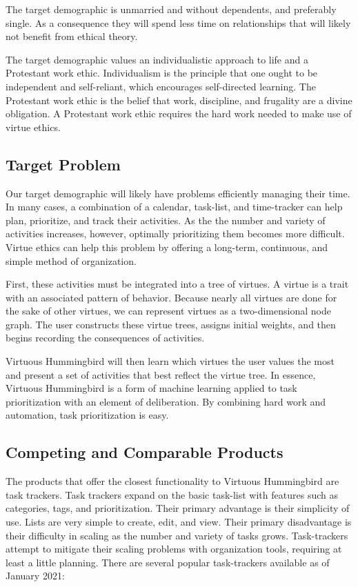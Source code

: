 \documentclass{article}
\begin{document}
The target demographic is unmarried and without dependents, and preferably single.
As a consequence they will spend less time on relationships that will likely not benefit from ethical theory.

The target demographic values an individualistic approach to life and a Protestant work ethic.
Individualism is the principle that one ought to be independent and self-reliant, which encourages self-directed learning.
The Protestant work ethic is the belief that work, discipline, and frugality are a divine obligation.
A Protestant work ethic requires the hard work needed to make use of virtue ethics.

\subsection{Target Problem}

Our target demographic will likely have problems efficiently managing their time.
In many cases, a combination of a calendar, task-list, and time-tracker can help plan, prioritize, and track their activities.
As the the number and variety of activities increases, however, optimally prioritizing them becomes more difficult.
Virtue ethics can help this problem by offering a long-term, continuous, and simple method of organization.

First, these activities must be integrated into a tree of virtues.
A virtue is a trait with an associated pattern of behavior.
Because nearly all virtues are done for the sake of other virtues, we can represent virtues as a two-dimensional node graph.
The user constructs these virtue trees, assigns initial weights, and then begins recording the consequences of activities.

Virtuous Hummingbird will then learn which virtues the user values the most and present a set of activities that best reflect the virtue tree.
In essence, Virtuous Hummingbird is a form of machine learning applied to task prioritization with an element of deliberation.
By combining hard work and automation, task prioritization is easy.

\subsection{Competing and Comparable Products}

The products that offer the closest functionality to Virtuous Hummingbird are task trackers.
Task trackers expand on the basic task-list with features such as categories, tags, and prioritization.
Their primary advantage is their simplicity of use.
Lists are very simple to create, edit, and view.
Their primary disadvantage is their difficulty in scaling as the number and variety of tasks grows.
Task-trackers attempt to mitigate their scaling problems with organization tools, requiring at least a little planning.
There are several popular task-trackers available as of January 2021:
\end{document}
